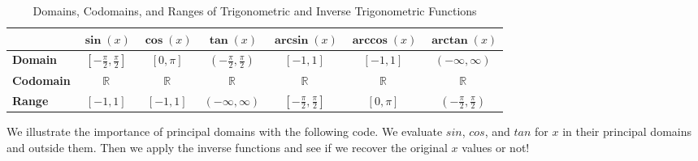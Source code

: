 \begin{table}[htb]
\renewcommand{\arraystretch}{1.5}
\centering
\begin{tabular}{|l|c|c|c|c|c|c|}
\hline
 & $\bm \sin(x)$ & $\bm \cos(x)$ & $\bm \tan(x)$ & $\bm \arcsin(x)$ & $\bm \arccos(x)$ & $\bm \arctan(x)$ \\
\hline
\textbf{Domain} & $[-\frac{\pi}{2}, \frac{\pi}{2}]$ & $[0, \pi]$ & $(- \frac{\pi}{2}, \frac{\pi}{2})$ & $[-1, 1]$ & $[-1, 1]$ & $(- \infty, \infty)$ \\
\hline
\textbf{Codomain} & $\mathbb{R}$ & $\mathbb{R}$ & $\mathbb{R}$ & $\mathbb{R}$ & $\mathbb{R}$ & $\mathbb{R}$ \\
\hline
\textbf{Range} & $[-1, 1]$ & $[-1, 1]$ & $(- \infty, \infty)$ & $[- \frac{\pi}{2}, \frac{\pi}{2}]$ & $[0, \pi]$ & $(- \frac{\pi}{2}, \frac{\pi}{2})$ \\
\hline
\end{tabular}
\caption{Domains, Codomains, and Ranges of Trigonometric and Inverse Trigonometric Functions}
\label{tab:InvTrigFunctions}
\end{table}


\bigskip

We illustrate the importance of principal domains with the following code. We evaluate $sin$, $cos$, and $tan$ for $x$ in their principal domains and outside them. Then we apply the inverse functions
and see if we recover the original $x$ values or not!

